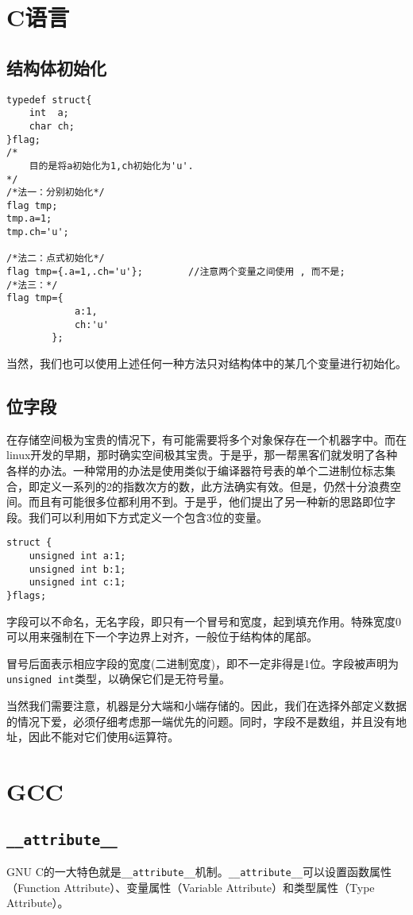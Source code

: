 	\section{C语言}
		\subsection{结构体初始化}
\begin{verbatim}
typedef struct{
	int  a;
	char ch;
}flag;
/*
	目的是将a初始化为1,ch初始化为'u'.
*/
/*法一：分别初始化*/
flag tmp;
tmp.a=1;
tmp.ch='u';

/*法二：点式初始化*/
flag tmp={.a=1,.ch='u'};		//注意两个变量之间使用 , 而不是;
/*法三：*/
flag tmp={
			a:1,
			ch:'u'
		};
\end{verbatim}
			当然，我们也可以使用上述任何一种方法只对结构体中的某几个变量进行初始化。

		\subsection{位字段}
			在存储空间极为宝贵的情况下，有可能需要将多个对象保存在一个机器字中。而在linux开发的早期，那时确实空间极其宝贵。于是乎，那一帮黑客们就发明了各种各样的办法。一种常用的办法是使用类似于编译器符号表的单个二进制位标志集合，即定义一系列的2的指数次方的数，此方法确实有效。但是，仍然十分浪费空间。而且有可能很多位都利用不到。于是乎，他们提出了另一种新的思路即位字段。我们可以利用如下方式定义一个包含3位的变量。

\begin{verbatim}
struct {
	unsigned int a:1;
	unsigned int b:1;
	unsigned int c:1;
}flags;
\end{verbatim}
			
			字段可以不命名，无名字段，即只有一个冒号和宽度，起到填充作用。特殊宽度0可以用来强制在下一个字边界上对齐，一般位于结构体的尾部。
			
			冒号后面表示相应字段的宽度(二进制宽度)，即不一定非得是1位。字段被声明为\texttt{unsigned int}类型，以确保它们是无符号量。

			当然我们需要注意，机器是分大端和小端存储的。因此，我们在选择外部定义数据的情况下爱，必须仔细考虑那一端优先的问题。同时，字段不是数组，并且没有地址，因此不能对它们使用\texttt{&}运算符。	
	\section{GCC}
		\subsection{\texttt{__attribute__}}
			GNU C的一大特色就是\texttt{__attribute__}机制。\texttt{__attribute__}可以设置函数属性（Function Attribute）、变量属性（Variable Attribute）和类型属性（Type Attribute）。

